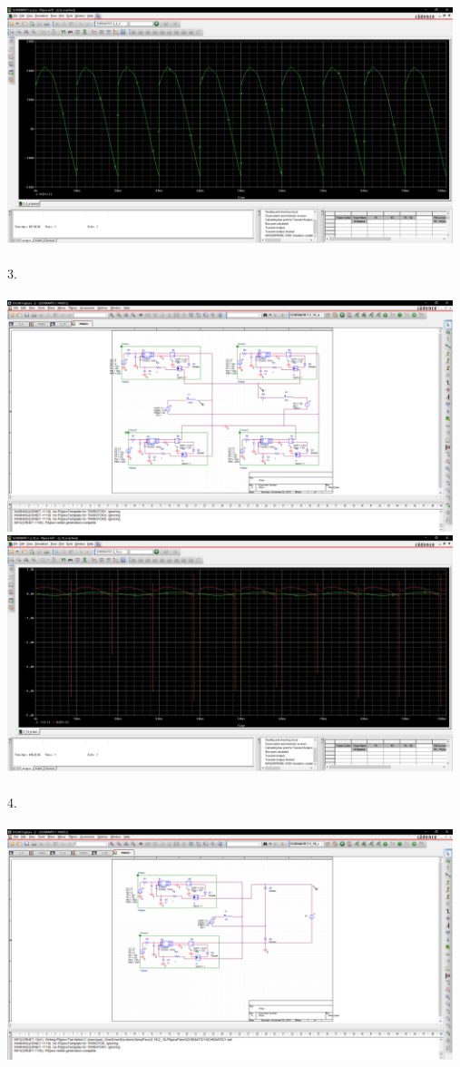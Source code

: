 \documentclass[letterpaper]{article}
\begin{document}
\begin{large}
    \includegraphics[width=13cm]{img/Sim/22.png}\\\\
    3.\\\\
    \includegraphics[width=13cm]{img/Sim/3.png}\\
    \includegraphics[width=13cm]{img/Sim/33.png}\\\\
    4.\\\\
    \includegraphics[width=13cm]{img/Sim/4.png}\\

\end{large}
\end{document}
